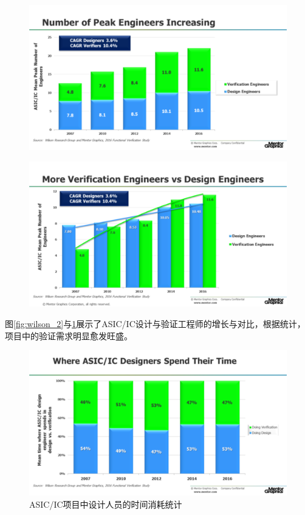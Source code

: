 \documentclass[a4paper,11pt]{article}
\begin{document}
\begin{figure}
\centering
\begin{minipage}[t]{.45\textwidth}
  \centering
  \includegraphics[width=.95\linewidth]{images/wilson2.png}
  \label{fig:wilson_2}
\end{minipage}%
\begin{minipage}[t]{.45\textwidth}
  \centering
  \includegraphics[width=.95\linewidth]{images/wilson3.png}
  \label{fig:wilson_3}
\end{minipage}
\end{figure}

图\ref{fig:wilson_2}与\ref{fig:wilson_3}展示了ASIC/IC设计与验证工程师的增长与对比，根据统计，项目中的验证需求明显愈发旺盛。

\begin{figure}[ht]
  \centering
  \includegraphics[width=0.8\linewidth]{images/wilson4.png}
  \caption{ASIC/IC项目中设计人员的时间消耗统计}
  \label{fig:wilson_4}
\end{figure}
\end{document}
